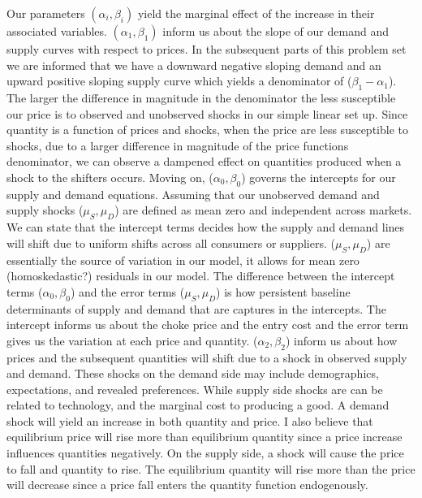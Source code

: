 \documentclass[12pt]{article}
\begin{document}
Our parameters $(\alpha_i, \beta_i)$ yield the marginal effect of the increase in their associated variables. $(\alpha_1, \beta_1)$ inform us about the slope of our demand and supply curves with respect to prices. In the subsequent parts of this problem set we are informed that we have a downward negative sloping demand and an upward positive sloping supply curve which yields a denominator of ($\beta_1 - \alpha_1$). The larger the difference in magnitude in the denominator the less susceptible our price is to observed and unobserved shocks in our simple linear set up. Since quantity is a function of prices and shocks, when the price are less susceptible to shocks, due to a larger difference in magnitude of the price functions denominator, we can observe a dampened effect on quantities produced when a shock to the shifters occurs. Moving on, ($\alpha_0, \beta_0$) governs the intercepts for our supply and demand equations. Assuming that our unobserved demand and supply shocks ($\mu_S, \mu_D$) are defined as mean zero and independent across markets. We can state that the intercept terms decides how the supply and demand lines will shift due to uniform shifts across all consumers or suppliers. ($\mu_S, \mu_D$) are essentially the source of variation in our model, it allows for mean zero (homoskedastic?) residuals in our model. The difference between the intercept terms ($\alpha_0, \beta_0$) and the error terms ($\mu_S, \mu_D$) is how persistent baseline determinants of supply and demand that are captures in the intercepts. The intercept informs us about the choke price and the entry cost and the error term gives us the variation at each price and quantity. ($\alpha_2, \beta_2$) inform us about how prices and the subsequent quantities will shift due to a shock in observed supply and demand. These shocks on the demand side may include demographics, expectations, and revealed preferences. While supply side shocks are can be related to technology, and the marginal cost to producing a good. A demand shock will yield an increase in both quantity and price. I also believe that equilibrium price will rise more than equilibrium quantity since a price increase influences quantities negatively. On the supply side, a shock will cause the price to fall and quantity to rise. The equilibrium quantity will rise more than the price will decrease since a price fall enters the quantity function endogenously.
\newpage
\end{document}
